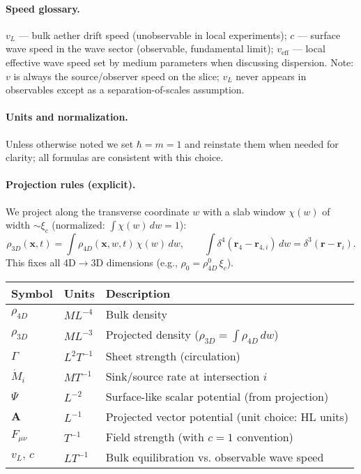 \paragraph{Speed glossary.} $v_L$ --- bulk aether drift speed (unobservable in local experiments); $c$ --- surface wave speed in the wave sector (observable, fundamental limit); $v_{\text{eff}}$ --- local effective wave speed set by medium parameters when discussing dispersion. Note: $v$ is always the source/observer speed on the slice; $v_L$ never appears in observables except as a separation-of-scales assumption.

\paragraph{Units and normalization.} Unless otherwise noted we set $\hbar=m=1$ and reinstate them when needed for clarity; all formulas are consistent with this choice.

\paragraph{Projection rules (explicit).} We project along the transverse coordinate $w$ with a slab window $\chi(w)$ of width $\sim\xi_c$ (normalized: $\int\chi(w)\,dw=1$):
\[
\rho_{3D}(\mathbf x,t)=\int \rho_{4D}(\mathbf x,w,t)\,\chi(w)\,dw,\qquad
\int\delta^4(\mathbf r_4-\mathbf r_{4,i})\,dw=\delta^3(\mathbf r-\mathbf r_i).
\]
This fixes all 4D$\to$3D dimensions (e.g., $\rho_0=\rho_{4D}^0\,\xi_c$).

\begin{tcolorbox}[title=Units cheat sheet,colback=gray!5,colframe=gray!35!black]
\begin{tabularx}{\linewidth}{@{}l l X@{}}
Symbol & Units & Description \\
\hline
$\rho_{4D}$ & $M L^{-4}$ & Bulk density \\
$\rho_{3D}$ & $M L^{-3}$ & Projected density ($\rho_{3D}=\int \rho_{4D}\,dw$) \\
$\Gamma$ & $L^{2} T^{-1}$ & Sheet strength (circulation) \\
$\dot M_i$ & $M T^{-1}$ & Sink/source rate at intersection $i$ \\
$\Psi$ & $L^{-2}$ & Surface-like scalar potential (from projection) \\
$\mathbf A$ & $L^{-1}$ & Projected vector potential (unit choice: HL units) \\
$F_{\mu\nu}$ & $T^{-1}$ & Field strength (with $c=1$ convention) \\
$v_L,\,c$ & $L T^{-1}$ & Bulk equilibration vs. observable wave speed \\
\end{tabularx}
\end{tcolorbox}

